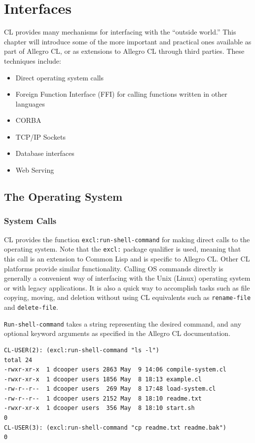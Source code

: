 \chapter{Interfaces}

CL provides many mechanisms for interfacing with the ``outside world.'' This chapter will
introduce some of the more important and practical ones available as part of Allegro CL,
or as extensions to Allegro CL through third parties. These techniques include:

\begin{itemize}
\item Direct operating system calls
\item Foreign Function Interface (FFI) for calling functions written in other languages
\item CORBA
\item TCP/IP Sockets
\item Database interfaces
\item Web Serving
\end{itemize}

\section{The Operating System}

\subsection{System Calls}

CL provides the function \texttt{excl:run-shell-command} for making direct calls to the operating
system. Note that the \texttt{excl:} package qualifier is used, meaning that this call is an extension
to Common Lisp and is specific to Allegro CL. Other CL platforms provide similar functionality. Calling OS commands directly is generally a convenient way of interfacing with the
Unix (Linux) operating system or with legacy applications. It is also a quick way to accomplish tasks such as file copying, moving, and deletion without using CL equivalents such
as \texttt{rename-file} and \texttt{delete-file}.

\texttt{Run-shell-command} takes a string representing the desired command, and any optional
keyword arguments as specified in the Allegro CL documentation.

\begin{verbatim}
CL-USER(2): (excl:run-shell-command "ls -l")
total 24
-rwxr-xr-x  1 dcooper users 2863 May  9 14:06 compile-system.cl
-rwxr-xr-x  1 dcooper users 1856 May  8 18:13 example.cl
-rw-r--r--  1 dcooper users  269 May  8 17:48 load-system.cl
-rw-r--r--  1 dcooper users 2152 May  8 18:10 readme.txt
-rwxr-xr-x  1 dcooper users  356 May  8 18:10 start.sh
0
CL-USER(3): (excl:run-shell-command "cp readme.txt readme.bak")
0
\end{verbatim}

